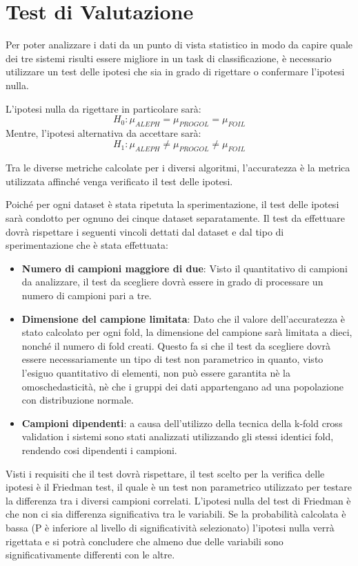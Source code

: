\section{Test di Valutazione}
\nocite{friedmanTest}
\nocite{wiki:Friedman}
Per poter analizzare i dati da un punto di vista statistico in modo da capire quale dei tre sistemi risulti essere migliore in un task di classificazione, è necessario utilizzare un test delle ipotesi che sia in grado di rigettare o confermare l'ipotesi nulla.

L'ipotesi nulla da rigettare in particolare sarà:
$$H_0 : \mu_{ALEPH} = \mu_{PROGOL} = \mu_{FOIL} $$
Mentre, l'ipotesi alternativa da accettare sarà:
$$H_1 : \mu_{ALEPH} \neq \mu_{PROGOL} \neq \mu_{FOIL} $$

Tra le diverse metriche calcolate per i diversi algoritmi, l'accuratezza è la metrica utilizzata affinché venga verificato il test delle ipotesi.

Poiché per ogni dataset è stata ripetuta la sperimentazione, il test delle ipotesi sarà condotto per ognuno dei cinque dataset separatamente.
Il test da effettuare dovrà rispettare i seguenti vincoli dettati dal dataset e dal tipo di sperimentazione che è stata effettuata:
\begin{itemize}
	\item \textbf{Numero di campioni maggiore di due}: Visto il quantitativo di campioni da analizzare, il test da scegliere dovrà essere in grado di processare un numero di campioni pari a tre.
	\item \textbf{Dimensione del campione limitata}: Dato che il valore dell'accuratezza è stato calcolato per ogni fold, la dimensione del campione sarà limitata a dieci, nonché il numero di fold creati. Questo fa si che il test da scegliere dovrà essere necessariamente un tipo di test non parametrico in quanto, visto l'esiguo quantitativo di elementi, non può essere garantita nè la omoschedasticità, nè che i gruppi dei dati appartengano ad una popolazione con distribuzione normale.
	\item \textbf{Campioni dipendenti}: a causa dell'utilizzo della tecnica della k-fold cross validation i sistemi sono stati analizzati utilizzando gli stessi identici fold, rendendo cosi dipendenti i campioni.
\end{itemize}

Visti i requisiti che il test dovrà rispettare, il test scelto per la verifica delle ipotesi è il Friedman test, il quale è un test non parametrico utilizzato per testare la differenza tra i diversi campioni correlati.
L'ipotesi nulla del test di Friedman è che non ci sia differenza significativa tra le variabili. Se la probabilità calcolata è bassa (P è inferiore al livello di significatività selezionato) l'ipotesi nulla verrà rigettata e si potrà concludere che almeno due delle variabili sono significativamente differenti con le altre.

